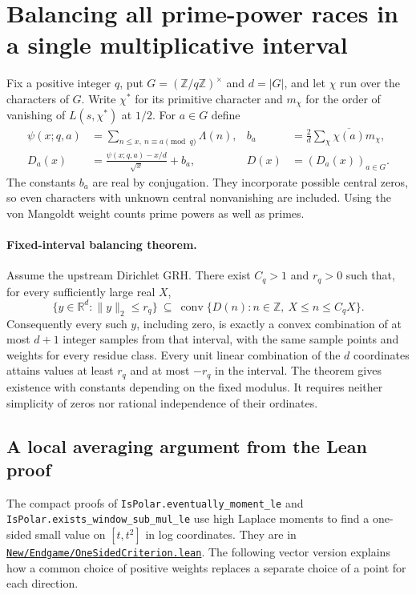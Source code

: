\section{Balancing all prime-power races in a single multiplicative interval}
\label{sec:balancing}
Fix a positive integer $q$, put $G=(\mathbb Z/q\mathbb Z)^\times$ and
$d=|G|$, and let $\chi$ run over the characters of $G$. Write $\chi^*$
for its primitive character and $m_\chi$ for the order of vanishing of
$L(s,\chi^*)$ at $1/2$. For $a\in G$ define
\begin{align}
 \psi(x;q,a)&=\sum_{n\leq x,\ n\equiv a\pmod q}\Lambda(n),&
 b_a&=\frac{2}{d}\sum_\chi\overline{\chi(a)}m_\chi,\nonumber\\
 D_a(x)&=\frac{\psi(x;q,a)-x/d}{\sqrt x}+b_a,&
 D(x)&=(D_a(x))_{a\in G}.\label{eq:racevec}
\end{align}
The constants $b_a$ are real by conjugation. They incorporate possible
central zeros, so even characters with unknown central nonvanishing
are included. Using the von Mangoldt weight counts prime powers as well as primes.

\paragraph{Fixed-interval balancing theorem.}
Assume the upstream Dirichlet GRH. There exist $C_q>1$ and $r_q>0$
such that, for every sufficiently large real $X$,
\[
 \{y\in\mathbb R^d:\|y\|_2\leq r_q\}
 \ \subseteq\ \operatorname{conv}\{D(n): n\in\mathbb Z,\ X\leq n\leq C_qX\}.
 \tag{B}\label{eq:ballrace}
\]
Consequently every such $y$, including zero, is exactly a convex
combination of at most $d+1$ integer samples from that interval, with
the same sample points and weights for every residue class. Every
unit linear combination of the $d$ coordinates attains values at least
$r_q$ and at most $-r_q$ in the interval. The theorem gives existence
with constants depending on the fixed modulus. It requires neither
simplicity of zeros nor rational independence of their ordinates.

\subsection{A local averaging argument from the Lean proof}

The compact proofs of \texttt{IsPolar.eventually\_moment\_le} and
\texttt{IsPolar.exists\_window\_sub\_mul\_le} use high Laplace moments to
find a one-sided small value on $[t,t^2]$ in log coordinates.
They are in
\href{https://github.com/lsernau/grh-lean/blob/72fead102f663d5c7a407964a13dc0cf9d977207/grh-compact/src/New/Endgame/OneSidedCriterion.lean}{\texttt{New/Endgame/OneSidedCriterion.lean}}.
The following vector version explains how a common choice of positive
weights replaces a separate choice of a point for each direction.

